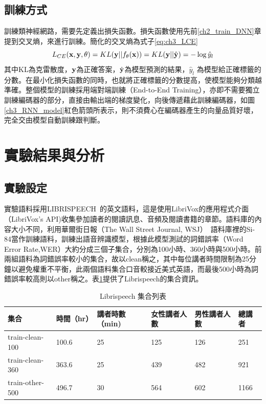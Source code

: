 \subsection{訓練方式}
訓練類神經網路，需要先定義出損失函數。損失函數使用先前\ref{ch2_train_DNN}章提到交叉熵，來進行訓練。簡化的交叉熵為式子\ref{eq:ch3_LCE}
\begin{equation} 
\label{eq:ch3_LCE}
L_{CE}(\bold{x} , \bold{y} , \theta) = KL(\bold{y} || f_{\theta}(\bold{x})) =KL( \bold{y} ||\hat{\bold {y}} )  = - \log \hat{y}_{l} 
\end{equation}
其中KL為克雷散度，$\bold{y}$為正確答案，$\hat{\bold{y}}$為模型預測的結果，$ \hat{y}_{l} $ 為模型給正確標籤的分數。在最小化損失函數的同時，也就將正確標籤的分數提高，使模型能夠分類越準確。整個模型的訓練採用端對端訓練（End-to-End
Training），亦即不需要獨立訓練編碼器的部分，直接由輸出端的梯度變化，向後傳遞藉此訓練編碼器，如圖\ref{ch3_RNN_model}紅色箭頭所表示，則不須費心在編碼器產生的向量品質好壞，完全交由模型自動訓練跟判斷。
\section{實驗結果與分析}
\subsection{實驗設定}
 實驗語料採用LIBRISPEECH~\cite{panayotov2015librispeech}的英文語料，這是使用LibriVox的應用程式介面（LibriVox's
 API)收集參加讀者的閱讀訊息、音頻及閱讀書籍的章節。語料庫的內容大小不同，利用華爾街日報（The
 Wall Street Journal,
 WSJ）~\cite{paul1992design}語料庫裡的Si-84當作訓練語料，訓練出語音辨識模型，根據此模型測試的詞錯誤率（Word
 Error
 Rate,WER）大約分成三個子集合，分別為100小時、360小時與500小時。前兩組語料為詞錯誤率較小的集合，故以clean稱之，其中每位講者時間限制為25分鐘以避免權重不平衡，此兩個語料集合口音較接近美式英語，而最後500小時為詞錯誤率較高則以other稱之。表\ref{table:ex_info}提供了Librispeech的集合資訊。
 \begin{table}[ht]
	 \caption{Librispeech 集合列表}
	 \label{table:ex_info}
 \begin{tabular}[t]{|l|l|l|l|l|l|}
	 \hline
	 集合 & 時間（hr） & 講者時數（min) &女性講者人數&男性講者人數&總講者\\
	 \hline
	 train-clean-100   & 100.6   & 25 & 125 & 126 & 251 \\
	 \hline
	 train-clean-360   & 363.6   & 25 & 439 & 482 & 921 \\
	 \hline
	 train-other-500   & 496.7   & 30 & 564 & 602 & 1166 \\
	 \hline
 \end{tabular}
 \end{table}
 
